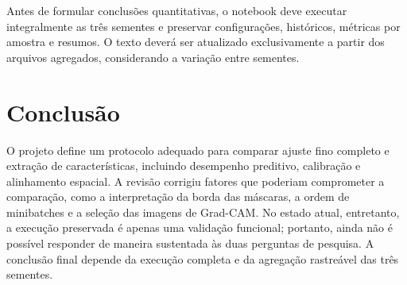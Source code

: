 \documentclass[conference]{IEEEtran}
\begin{document}
Antes de formular conclusões quantitativas, o notebook deve executar integralmente as três sementes e preservar configurações, históricos, métricas por amostra e resumos. O texto deverá ser atualizado exclusivamente a partir dos arquivos agregados, considerando a variação entre sementes.

\section{Conclusão}

O projeto define um protocolo adequado para comparar ajuste fino completo e extração de características, incluindo desempenho preditivo, calibração e alinhamento espacial. A revisão corrigiu fatores que poderiam comprometer a comparação, como a interpretação da borda das máscaras, a ordem de minibatches e a seleção das imagens de Grad-CAM. No estado atual, entretanto, a execução preservada é apenas uma validação funcional; portanto, ainda não é possível responder de maneira sustentada às duas perguntas de pesquisa. A conclusão final depende da execução completa e da agregação rastreável das três sementes.



\end{document}
